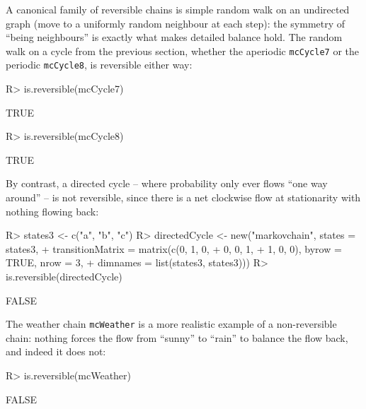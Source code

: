 \documentclass[
  nojss]{jss}
\begin{document}
A canonical family of reversible chains is simple random walk on an
undirected graph (move to a uniformly random neighbour at each step): the
symmetry of ``being neighbours'' is exactly what makes detailed balance hold.
The random walk on a cycle from the previous section, whether the aperiodic
\texttt{mcCycle7} or the periodic \texttt{mcCycle8}, is reversible either way:

\begin{CodeChunk}
\begin{CodeInput}
R> is.reversible(mcCycle7)
\end{CodeInput}
\begin{CodeOutput}
[1] TRUE
\end{CodeOutput}
\begin{CodeInput}
R> is.reversible(mcCycle8)
\end{CodeInput}
\begin{CodeOutput}
[1] TRUE
\end{CodeOutput}
\end{CodeChunk}

By contrast, a directed cycle -- where probability only ever flows ``one way
around'' -- is not reversible, since there is a net clockwise flow at
stationarity with nothing flowing back:

\begin{CodeChunk}
\begin{CodeInput}
R> states3 <- c("a", "b", "c")
R> directedCycle <- new("markovchain", states = states3,
+   transitionMatrix = matrix(c(0, 1, 0,
+                               0, 0, 1,
+                               1, 0, 0), byrow = TRUE, nrow = 3,
+                             dimnames = list(states3, states3)))
R> is.reversible(directedCycle)
\end{CodeInput}
\begin{CodeOutput}
[1] FALSE
\end{CodeOutput}
\end{CodeChunk}

The weather chain \texttt{mcWeather} is a more realistic example of a non-reversible
chain: nothing forces the flow from ``sunny'' to ``rain'' to balance the flow
back, and indeed it does not:

\begin{CodeChunk}
\begin{CodeInput}
R> is.reversible(mcWeather)
\end{CodeInput}
\begin{CodeOutput}
[1] FALSE
\end{CodeOutput}
\end{CodeChunk}
\end{document}
